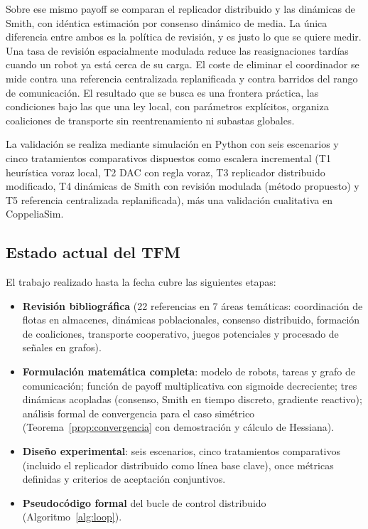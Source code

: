 Sobre ese mismo payoff se comparan el replicador distribuido y las dinámicas de
Smith, con idéntica estimación por consenso dinámico de media. La única diferencia entre
ambos es la política de revisión, y es justo lo que se quiere medir. Una tasa de revisión
espacialmente modulada reduce las reasignaciones tardías cuando un robot ya está cerca de
su carga. El coste de eliminar el coordinador se mide contra una referencia centralizada
replanificada y contra barridos del rango de comunicación. El resultado que se busca es
una frontera práctica, las condiciones bajo las que una ley local, con parámetros explícitos,
organiza coaliciones de transporte sin reentrenamiento ni subastas globales.

La validación se realiza mediante simulación en Python con seis
escenarios y cinco tratamientos comparativos dispuestos como escalera incremental
(T1 heurística voraz local, T2 DAC con regla voraz, T3 replicador distribuido
modificado, T4 dinámicas de Smith con revisión modulada (método propuesto) y
T5 referencia centralizada replanificada), más una validación cualitativa en CoppeliaSim.

\subsection{Estado actual del TFM}
\label{subsec:estado}

El trabajo realizado hasta la fecha cubre las siguientes etapas:

\begin{itemize}
  \item \textbf{Revisión bibliográfica} (22 referencias en 7 áreas temáticas:
    coordinación de flotas en almacenes, dinámicas poblacionales, consenso
    distribuido, formación de coaliciones, transporte cooperativo, juegos
    potenciales y procesado de señales en grafos).
  \item \textbf{Formulación matemática completa}: modelo de robots, tareas y
    grafo de comunicación; función de payoff multiplicativa con sigmoide
    decreciente; tres dinámicas acopladas (consenso, Smith en tiempo discreto,
    gradiente reactivo); análisis formal de convergencia para el caso simétrico
    (Teorema~\ref{prop:convergencia} con demostración y cálculo de Hessiana).
  \item \textbf{Diseño experimental}: seis escenarios, cinco tratamientos
    comparativos (incluido el replicador distribuido como línea base clave),
    once métricas definidas y criterios de aceptación conjuntivos.
  \item \textbf{Pseudocódigo formal} del bucle de control distribuido
    (Algoritmo~\ref{alg:loop}).
\end{itemize}

